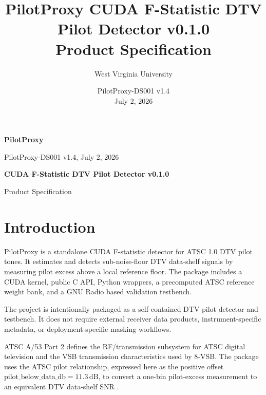 \documentclass[10pt,letterpaper]{article}
\title{PilotProxy CUDA F-Statistic DTV Pilot Detector v0.1.0\\Product Specification}
\author{West Virginia University}
\date{PilotProxy-DS001 v1.4 \\ July 2, 2026}
\newcommand{\dB}{\,\mathrm{dB}}
\begin{document}
\thispagestyle{fancy}
{\sffamily
\begin{minipage}[t]{0.39\textwidth}
  {\fontsize{24}{26}\selectfont\bfseries\color{FStatRed}PilotProxy}\par
  {\small PilotProxy-DS001 v1.4, July 2, 2026}
\end{minipage}
\hfill
\begin{minipage}[t]{0.58\textwidth}
  \raggedleft
  {\fontsize{18}{20}\selectfont\bfseries CUDA F-Statistic DTV Pilot Detector v0.1.0}\par
  {\small Product Specification}
\end{minipage}
}

\vspace{0.14in}

\begin{minipage}[t]{0.48\textwidth}
\section*{Introduction}
PilotProxy is a standalone CUDA F-statistic detector for ATSC 1.0 DTV pilot tones.  It estimates and detects sub-noise-floor DTV data-shelf signals by measuring pilot excess above a local reference floor.  The package includes a CUDA kernel, public C API, Python wrappers, a precomputed ATSC reference weight bank, and a GNU Radio based validation testbench.

The project is intentionally packaged as a self-contained DTV pilot detector and testbench.  It does not require external receiver data products, instrument-specific metadata, or deployment-specific masking workflows.

ATSC A/53 Part 2 defines the RF/transmission subsystem for ATSC digital television and the VSB transmission characteristics used by 8-VSB.  The package uses the ATSC pilot relationship, expressed here as the positive offset \(\mathrm{pilot\_below\_data\_db}=11.3\dB\), to convert a one-bin pilot-excess measurement to an equivalent DTV data-shelf SNR \cite{atsc_a53_part2_2011}.


\end{minipage}
\end{document}
